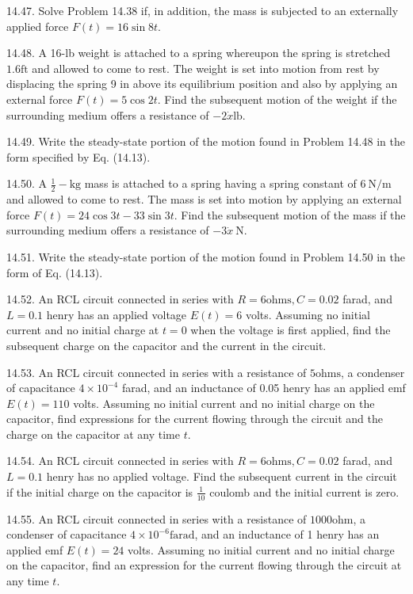 \documentclass[10pt]{article}
\begin{document}
14.47. Solve Problem 14.38 if, in addition, the mass is subjected to an externally applied force $F(t)=16 \sin 8 t$.

14.48. A 16-lb weight is attached to a spring whereupon the spring is stretched $1.6 \mathrm{ft}$ and allowed to come to rest. The weight is set into motion from rest by displacing the spring 9 in above its equilibrium position and also by applying an external force $F(t)=5 \cos 2 t$. Find the subsequent motion of the weight if the surrounding medium offers a resistance of $-2 \dot{x} \mathrm{lb}$.

14.49. Write the steady-state portion of the motion found in Problem 14.48 in the form specified by Eq. (14.13).

14.50. A $\frac{1}{2}-\mathrm{kg}$ mass is attached to a spring having a spring constant of $6 \mathrm{~N} / \mathrm{m}$ and allowed to come to rest. The mass is set into motion by applying an external force $F(t)=24 \cos 3 t-33 \sin 3 t$. Find the subsequent motion of the mass if the surrounding medium offers a resistance of $-3 \dot{x} \mathrm{~N}$.

14.51. Write the steady-state portion of the motion found in Problem 14.50 in the form of Eq. (14.13).

14.52. An RCL circuit connected in series with $R=6 \mathrm{ohms}, C=0.02$ farad, and $L=0.1$ henry has an applied voltage $E(t)=6$ volts. Assuming no initial current and no initial charge at $t=0$ when the voltage is first applied, find the subsequent charge on the capacitor and the current in the circuit.

14.53. An RCL circuit connected in series with a resistance of $5 \mathrm{ohms}$, a condenser of capacitance $4 \times 10^{-4}$ farad, and an inductance of 0.05 henry has an applied emf $E(t)=110$ volts. Assuming no initial current and no initial charge on the capacitor, find expressions for the current flowing through the circuit and the charge on the capacitor at any time $t$.

14.54. An RCL circuit connected in series with $R=6 \mathrm{ohms}, C=0.02$ farad, and $L=0.1$ henry has no applied voltage. Find the subsequent current in the circuit if the initial charge on the capacitor is $\frac{1}{10}$ coulomb and the initial current is zero.

14.55. An RCL circuit connected in series with a resistance of $1000 \mathrm{ohm}$, a condenser of capacitance $4 \times 10^{-6} \mathrm{farad}$, and an inductance of 1 henry has an applied emf $E(t)=24$ volts. Assuming no initial current and no initial charge on the capacitor, find an expression for the current flowing through the circuit at any time $t$.
\end{document}
